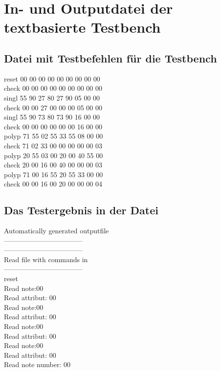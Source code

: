 \chapter{In- und Outputdatei der textbasierte Testbench}\label{chap.anhang_midi_input}

\section*{Datei mit Testbefehlen für die Testbench}
reset 00 00 00 00 00 00 00 00 00\\
check 00 00 00 00 00 00 00 00 00\\
singl 55 90 27 80 27 90 05 00 00\\
check 00 00 27 00 00 00 05 00 00\\
singl 55 90 73 80 73 90 16 00 00\\
check 00 00 00 00 00 00 16 00 00\\
polyp 71 55 02 55 33 55 08 00 00\\
check 71 02 33 00 00 00 00 00 03\\
polyp 20 55 03 00 20 00 40 55 00\\
check 20 00 16 00 40 00 00 00 03\\
polyp 71 00 16 55 20 55 33 00 00\\
check 00 00 16 00 20 00 00 00 04\\

\section*{Das Testergebnis in der Datei}
Automatically generated outputfile\\
-----------------------------------\\
-----------------------------------\\


Read file with commands in\\
-----------------------------------\\
reset\\
Read note:00\\
Read attribut: 00\\
Read note:00\\
Read attribut: 00\\
Read note:00\\
Read attribut: 00\\
Read note:00\\
Read attribut: 00\\
Read note number: 00\\

